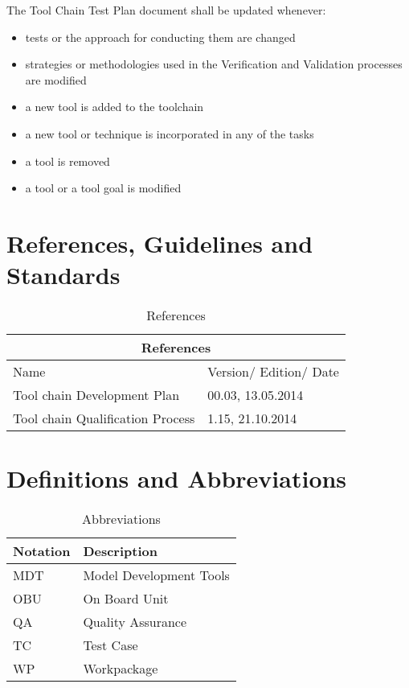 The Tool Chain Test Plan document shall be updated whenever:
\begin{itemize}
\item tests or the approach for conducting them are changed
\item strategies or methodologies used in the Verification and Validation processes are modified
\item a new tool is added to the toolchain
\item a new tool or technique is incorporated in any of the tasks 
\item a tool is removed
\item a tool or a tool goal is modified
\end{itemize}

\section{References, Guidelines and Standards}

\begin{table}[htbp]
\begin{tabular}{|m{}|m{4cm}|}
\hline
\multicolumn{2}{|c|}{\textbf{References}} \\\hline
Name &
Version/ Edition/ Date
\\\hline
Tool chain Development Plan & 00.03, 13.05.2014
\\\hline
Tool chain Qualification Process & 1.15, 21.10.2014
 \\\hline
\end{tabular}
\caption{References}
\end{table}

\section{Definitions and Abbreviations}

\begin{table}[htbp]
\begin{tabular}{|m{3cm}|m{8cm}|}
\hline
\textbf{Notation} &
\textbf{Description} 
\\\hline
MDT & Model Development Tools
 \\\hline
OBU & On Board Unit
\\\hline
QA & Quality Assurance
\\\hline
TC & Test Case
\\\hline
WP & Workpackage
\\\hline
\end{tabular}
\caption{Abbreviations}
\end{table}

